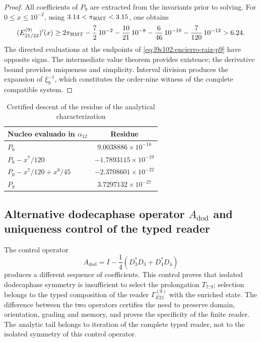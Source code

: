 \begin{proof}
All coefficients of \(P_9\) are extracted from the invariants prior to
solving. For \(0\leq x\leq10^{-2}\), using
\(3.14<\pi_{\rm HMT}<3.15\), one obtains
\[
 (E_{21/22}^{(9)})'(x)
 \geq 2\pi_{\rm HMT}-\frac72\,10^{-2}
 -\frac{10}{21}\,10^{-8}-\frac6{46}\,10^{-10}
 -\frac7{120}\,10^{-12}>6.24.
\]
The directed evaluations at the endpoints of
\cref{eq:l9s102:encierro-raiz-p9} have opposite signs. The intermediate
value theorem provides existence; the derivative bound provides
uniqueness and simplicity. Interval division produces the expansion of
\(\xi_9^{-1}\), which constitutes the order-nine witness of the complete
compatible system.
\end{proof}

\begin{table}[htbp]
\centering
\caption{Certified descent of the residue of the analytical characterization}
\label{tab:l9s102:alpha-residuos}
\begin{tabular}{@{}lc@{}}
\toprule
Nucleo evaluado in \(\alpha_{12}\) & Residue \\
\midrule
\(P_6\) & \(9.0038886\times10^{-18}\) \\
\(P_6-x^7/120\) & \(-1.7893115\times10^{-19}\) \\
\(P_6-x^7/120+x^8/45\) & \(-2.3708601\times10^{-22}\) \\
\(P_9\) & \(3.7297132\times10^{-27}\) \\
\bottomrule
\end{tabular}
\end{table}

\subsection{Alternative dodecaphase operator \texorpdfstring{\(A_{\mathrm{dod}}\)}{A_dod} and uniqueness control of the typed reader}
\label{sec:l9s102:alpha-control}

The control operator
\begin{equation}
 A_{\mathrm{dod}}
 =I-\frac14(D_3^*D_3+D_4^*D_4)
 \label{eq:l9s102:alpha-control-alternativo}
\end{equation}
produces a different sequence of coefficients. This control proves that
isolated dodecaphase symmetry is insufficient to select the
prolongation \(T_{7:9}\); selection belongs to the typed composition of the
reader \(\Gamma_{E21}^{(9)}\) with the enriched state. The difference between
the two operators certifies the need to preserve domain, orientation,
grading and memory, and proves the specificity of the finite reader. The analytic
tail belongs to iteration of the complete typed reader, not to the
isolated symmetry of this control operator.

